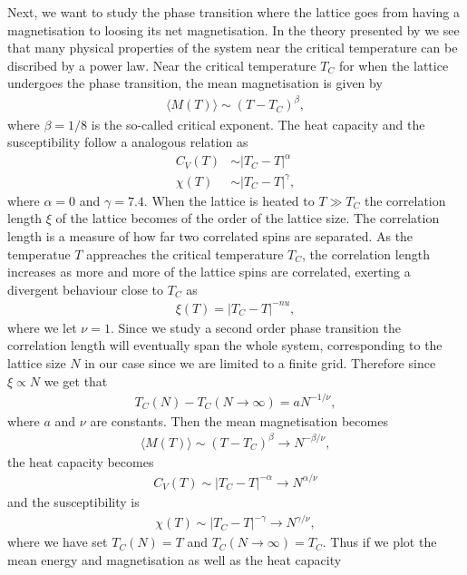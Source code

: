 \documentclass[twocolumn]{aastex62}
\begin{document}
Next, we want to study the phase transition where the lattice goes from having a
magnetisation to loosing its net magnetisation. In the theory presented by
\cite{jensen:2019} we see that many physical properties of the system near the
critical temperature can be discribed by a power law. Near the critical temperature
$T_C$ for when the lattice undergoes the phase transition, the mean magnetisation is
given by 
\begin{align}
	\langle M(T) \rangle \sim (T-T_C)^\beta,
\end{align}
where $\beta = 1/8$ is the so-called critical exponent. The heat capacity and
the susceptibility follow a analogous relation as
\begin{align}
	C_V(T) &\sim |T_C - T|^\alpha \\
	\chi(T) &\sim |T_C - T|^\gamma,
\end{align}
where $\alpha = 0$ and $\gamma = 7.4$. When the lattice is heated to $T \gg T_C$
the correlation length $\xi$ of the lattice becomes of the order of the lattice size.
The correlation length is a measure of how far two correlated spins are
separated. As the temperatue $T$ appreaches the critical temperature $T_C$, the
correlation length increases as more and more of the lattice spins are correlated, exerting a divergent behaviour close to $T_C$ as 
\begin{align}
	\xi(T) = |T_C - T|^{-nu},
\end{align}
where we let $\nu = 1$. Since we study a second order phase transition the
correlation length will eventually span the whole system, corresponding to the
lattice size $N$ in our case since we are limited to a finite grid. Therefore since
$\xi\propto N$ we get that 
\begin{align}
	T_C(N) - T_C(N\to\infty) = aN^{-1/\nu},
	\label{eq:temp_crit}
\end{align}
where $a$ and $\nu$ are constants. Then the mean magnetisation becomes 
\begin{align}
	\langle M(T)\rangle \sim (T - T_C)^\beta \to N^{-\beta/\nu},
\end{align}
the heat capacity becomes 
\begin{align}
	C_V(T) \sim |T_C - T|^{-\alpha}\to N^{\alpha / \nu}
\end{align}
and the susceptibility is 
\begin{align}
	\chi(T)\sim |T_C - T|^{-\gamma} \to N^{\gamma/\nu},
\end{align}
where we have set $T_C(N) = T$ and $T_C(N\to\infty) = T_C$.
Thus if we plot the mean energy and magnetisation as well as the heat capacity
\end{document}
